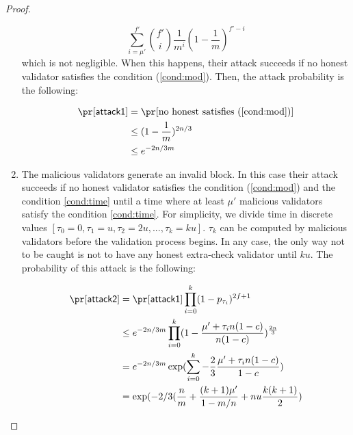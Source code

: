 \begin{proof}
\begin{enumerate}
    \begin{equation}\label{eq:attack1cond}
        \sum_{i = \mu'}^{f'}\binom{f'}{i}\frac{1}{m^{i}}(1-\frac{1}{m})^{f'-i}    
    \end{equation}
     which is not negligible. When this happens, their attack succeeds if no honest validator satisfies the condition (\ref{cond:mod}). Then, the attack probability is the following:
	
	\begin{align}\label{eq:nocond1}
	\pr[\mathsf{attack1}] &= \pr[\text{no honest satisfies (\ref{cond:mod})}] \\ \nonumber
									 & \leq   (1-\frac{1}{m})^{2n/3} \\ \nonumber
									 & \leq  e^{-2n/3m} 
	\end{align}
	
	
	

	
    \item The malicious validators generate an invalid block. In this case their attack succeeds if no honest validator satisfies the condition (\ref{cond:mod}) and the condition \ref{cond:time} until a time where at least $\mu'$ malicious validators satisfy the condition \ref{cond:time}. 
    For simplicity, we divide time in discrete values $[\tau_0 = 0, \tau_1 =u, \tau_2 = 2u, ..., \tau_k = ku]$. $\tau_k$ can be computed by malicious validators before the validation process begins. In any case, the only way not to be caught is not to have any honest extra-check validator until $ku$. The probability of this attack is the following:
    
    
    
    \begin{align}\label{eq:attack2}
        \pr[\mathsf{attack2}] &= \pr[\mathsf{attack1}]\prod_{i = 0}^k(1-p_{\tau_i})^{2f+1} \nonumber \\
        &\leq  e^{-2n/3m} \prod_{i = 0}^k (1 - \frac{\mu'+\tau_in(1-c)}{n(1-c)})^{\frac{2n}{3}} \nonumber\\
        &=  e^{-2n/3m} \exp(\sum_{i = 0}^k -\frac{2}{3}\frac{\mu' + \tau_in(1-c)}{1-c}) \nonumber\\
        & = \exp(-2/3(\frac{n}{m}+\frac{(k+1)\mu'}{1-m/n}+ nu\frac{k(k+1)}{2})
    \end{align}
    

\end{enumerate}
\end{proof}
